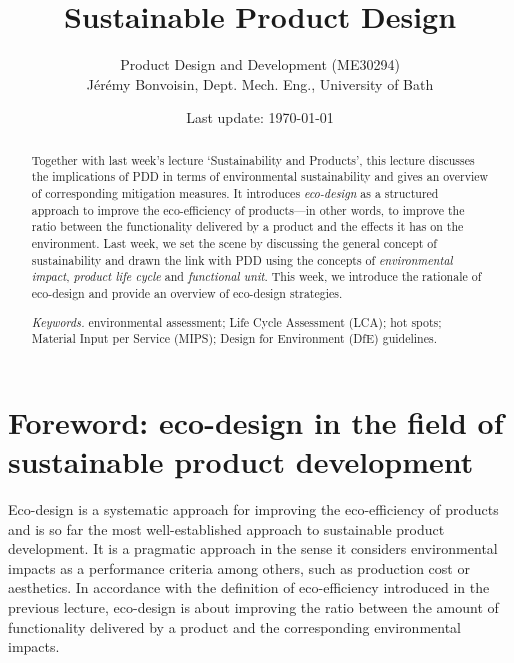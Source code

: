 \documentclass{article}
\newcommand{\subtitle}[1]{%
  \posttitle{%
    \par\end{center}
    \begin{center}\large#1\end{center}
    \vskip0.5em}%
}
\begin{document}
\title{Sustainable Product Design}

\author{Product Design and Development (ME30294) \\ Jérémy Bonvoisin, Dept. Mech. Eng., University of Bath}
\date{Last update: \today}

\maketitle

\begin{abstract}
Together with last week's lecture `Sustainability and Products', this lecture discusses the implications of PDD in terms of environmental sustainability and gives an overview of corresponding mitigation measures. It introduces \emph{eco-design} as a structured approach to improve the eco-efficiency of products---in other words, to improve the ratio between the functionality delivered by a product and the effects it has on the environment. Last week, we set the scene by discussing the general concept of sustainability and drawn the link with PDD using the concepts of \emph{environmental impact}, \emph{product life cycle} and \emph{functional unit}. This week, we introduce the rationale of eco-design and provide an overview of eco-design strategies. 

{{\it Keywords.} environmental assessment; Life Cycle Assessment (LCA); hot spots; Material Input per Service (MIPS); Design for Environment (DfE) guidelines.}
\end{abstract}

\tableofcontents

\section{Foreword: eco-design in the field of sustainable product development}
\label{sec:foreword}

Eco-design is a systematic approach for improving the eco-efficiency of products and is so far the most well-established approach to sustainable product development. It is a pragmatic approach in the sense it considers environmental impacts as a performance criteria among others, such as production cost or aesthetics. In accordance with the definition of eco-efficiency introduced in the previous lecture, eco-design is about improving the ratio between the amount of functionality delivered by a product and the corresponding environmental impacts. 
\end{document}
